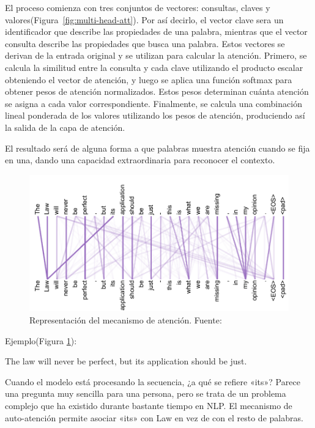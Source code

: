 El proceso comienza con tres conjuntos de vectores: consultas, claves y valores(Figura~\ref{fig:multi-head-att}). Por así decirlo, el vector clave sera un identificador que describe las propiedades de una palabra, mientras que el vector consulta describe las propiedades que busca una palabra. Estos vectores se derivan de la entrada original y se utilizan para calcular la atención. Primero, se calcula la similitud entre la consulta y cada clave utilizando el producto escalar obteniendo el vector  de atención, y luego se aplica una función softmax para obtener pesos de atención normalizados. Estos pesos determinan cuánta atención se asigna a cada valor correspondiente. Finalmente, se calcula una combinación lineal ponderada de los valores utilizando los pesos de atención, produciendo así la salida de la capa de atención. \cite{video-youtube}

El resultado será de alguna forma a que palabras muestra atención cuando se fija en una, dando una capacidad extraordinaria para reconocer el contexto. 

   
   \begin{figure}[h]
       \centering
       \includegraphics[width=.7\textwidth]{plantilla-libro/img/clave_valor_atencion.png}
       \caption{Representación del mecanismo de atención. Fuente: \cite{vaswani2023attention}}
       \label{fig:representacon_atencion}
   \end{figure}
    Ejemplo(Figura \ref{fig:representacon_atencion}):
    
    The law will never be perfect, but its application should be just.
    
    Cuando el modelo está procesando la secuencia, ¿a qué se refiere «its»? Parece una pregunta muy sencilla para una persona, pero se trata de un problema complejo que ha existido durante bastante tiempo en NLP. El mecanismo de auto-atención permite asociar «its» con Law en vez de con el resto de palabras.
    

